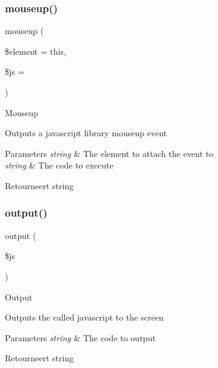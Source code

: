 \subsubsection{\texorpdfstring{mouseup()}{mouseup()}}
{\footnotesize\ttfamily mouseup (\begin{DoxyParamCaption}\item[{}]{\$element = {\ttfamily \textquotesingle{}this\textquotesingle{}},  }\item[{}]{\$js = {\ttfamily \textquotesingle{}\textquotesingle{}} }\end{DoxyParamCaption})}

Mouseup

Outputs a javascript library mouseup event


\begin{DoxyParams}{Parameters}
{\em string} & The element to attach the event to \\
\hline
{\em string} & The code to execute \\
\hline
\end{DoxyParams}
\begin{DoxyReturn}{Retourneert}
string 
\end{DoxyReturn}
\mbox{\label{class_c_i___javascript_a95bc25e9063b14d257e97e4b205073ba}} 
\subsubsection{\texorpdfstring{output()}{output()}}
{\footnotesize\ttfamily output (\begin{DoxyParamCaption}\item[{}]{\$js }\end{DoxyParamCaption})}

Output

Outputs the called javascript to the screen


\begin{DoxyParams}{Parameters}
{\em string} & The code to output \\
\hline
\end{DoxyParams}
\begin{DoxyReturn}{Retourneert}
string 
\end{DoxyReturn}
\mbox{\label{class_c_i___javascript_a00997e6137ed7dc0de0159ed143a107b}} 
